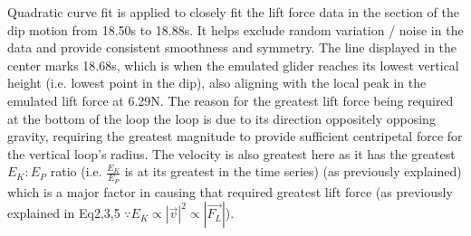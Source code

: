 \documentclass[11pt, a4paper]{article}
\begin{document}
	Quadratic curve fit is applied to closely fit the lift force data in the section of the dip motion from 18.50s to 18.88s. It helps exclude random variation / noise in the data and provide consistent smoothness and symmetry. The line displayed in the center marks 18.68s, which is when the emulated glider reaches its lowest vertical height (i.e. lowest point in the dip), also aligning with the local peak in the emulated lift force at 6.29N. The reason for the greatest lift force being required at the bottom of the loop the loop is due to its direction oppositely opposing gravity, requiring the greatest magnitude to provide sufficient centripetal force for the vertical loop's radius. The velocity is also greatest here as it has the greatest $E_K:E_P$ ratio (i.e. $\frac{E_K}{E_P}$ is at its greatest in the time series) (as previously explained) which is a major factor in causing that required greatest lift force (as previously explained in Eq2,3,5 $\because E_K\propto|\vec{v}|^2\propto |\vec{F_L}|$).
\end{document}
